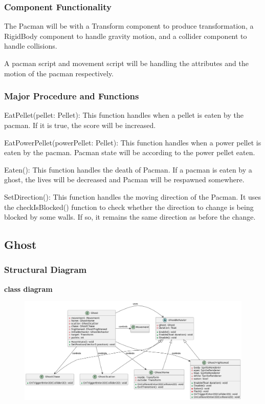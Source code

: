 \documentclass[11pt]{article}
\begin{document}
\subsubsection{Component Functionality}
The Pacman will be with a Transform component to produce transformation, a RigidBody component to handle gravity motion, and a collider component to handle collisions.

A pacman script and movement script will be handling the attributes and the motion of the pacman respectively.

\subsubsection{Major Procedure and Functions}
EatPellet(pellet: Pellet): This function handles when a pellet is eaten by the pacman. If it is true, the score will be increased.

EatPowerPellet(powerPellet: Pellet): This function handles when a power pellet is eaten by the pacman. Pacman state will be according to the power pellet eaten.

Eaten(): This function handles the death of Pacman. If a pacman is eaten by a ghost, the lives will be decreased and Pacman will be respawned somewhere.

SetDirection(): This function handles the moving direction of the Pacman. It uses the checkIsBlocked() function to check whether the direction to change is being blocked by some walls. If so, it remains the same direction as before the change.
\subsection{Ghost}
\subsubsection{Structural Diagram}
\textbf{class diagram}\\
\begin{figure}[H]
    \centering
    \includegraphics*[scale=0.25]{Ghost_Class.png}
\end{figure}
\end{document}

